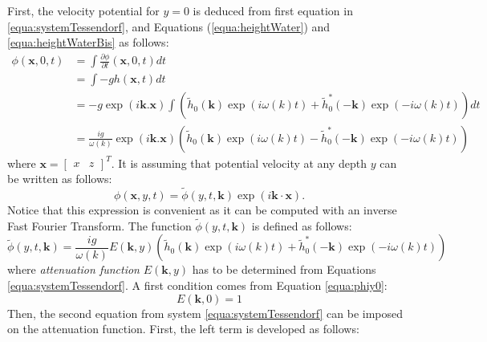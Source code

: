 \documentclass[final]{jcgt}
\begin{document}
First, the velocity potential for $y=0$ is deduced from first equation in \ref{equa:systemTessendorf}, and Equations (\ref{equa:heightWater}) and \ref{equa:heightWaterBis} as follows:
\begin{align}
	\phi(\mathbf{x},0,t)
	 & = \int \frac{\partial \phi}{\partial t}(\mathbf{x},0,t)dt \nonumber                                                                                                             \\
	 & =\int-gh(\mathbf{x},t)dt \nonumber                                                                                                                                              \\
	 & = -g\exp(i\mathbf{k}.\mathbf{\mathbf{x}})\int\left(\tilde{h}_0(\mathbf{k})\exp(i\omega(k)t)+\tilde{h}_0^*(-\mathbf{k})\exp(-i\omega(k)t)\right)dt \nonumber                     \\
	 & = \frac{ig}{\omega(k)}\exp(i\mathbf{k}.\mathbf{\mathbf{x}})\left(\tilde{h}_0(\mathbf{k})\exp(i\omega(k)t)-\tilde{h}_0^*(-\mathbf{k})\exp(-i\omega(k)t)\right)\label{equa:phiy0}
\end{align}
where $\mathbf{x}=\left[\begin{array}{cc}x&z\end{array}\right]^T$.
It is assuming that potential velocity at any depth $y$ can be written as follows:
\begin{equation}
	\phi(\mathbf{x},y,t) = \tilde{\phi}(y, t,\mathbf{k})\exp(i \mathbf{k}\cdot \mathbf{x}).
\end{equation}
Notice that this expression is convenient as it can be computed with an inverse Fast Fourier Transform.
The function $\tilde{\phi}(y, t,\mathbf{k})$ is defined as follows:
\begin{equation}
	\tilde{\phi}(y, t,\mathbf{k})=\frac{ig}{\omega(k)} E(\mathbf{k},y) \left(\tilde{h}_0(\mathbf{k})\exp(i\omega(k)t)+\tilde{h}_0^*(-\mathbf{k})\exp(-i\omega(k)t)\right)
\end{equation}
where \textit{attenuation function} $E(\mathbf{k},y)$ has to be determined from Equations \ref{equa:systemTessendorf}.
A first condition comes from Equation \ref{equa:phiy0}:
\begin{equation}
	E(\mathbf{k}, 0)=1 \label{equa:initialE}
\end{equation}
Then, the second equation from system \ref{equa:systemTessendorf} can be imposed on the attenuation function.
First, the left term is developed as follows:
\end{document}
